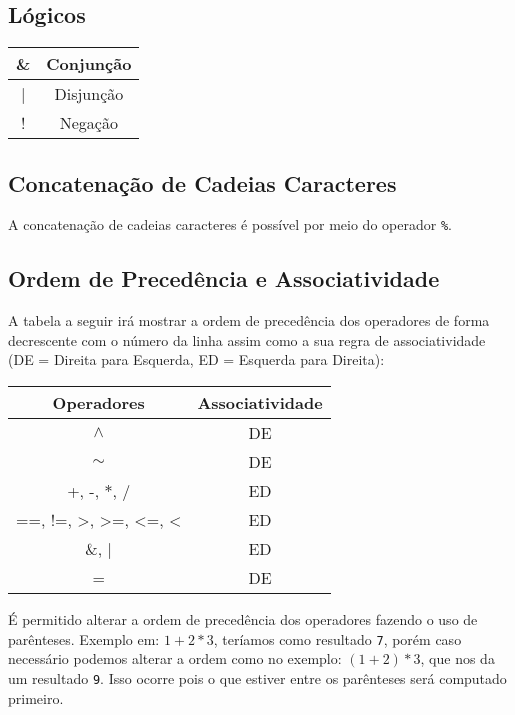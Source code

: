 \documentclass[a4paper,12pt]{article}
\begin{document}
\subsection{Lógicos}
\begin{center}
    \begin{tabular}{|c|c|}
         \hline
         \& & Conjunção\\
         \hline
         | & Disjunção\\
         \hline
         ! & Negação\\
         \hline
    \end{tabular}
\end{center}

\subsection{Concatenação de Cadeias Caracteres}
A concatenação de cadeias caracteres é possível por meio do operador \texttt{\%}.

\subsection{Ordem de Precedência e Associatividade}
A tabela a seguir irá mostrar a ordem de precedência dos operadores de forma decrescente com o
número da linha assim como a sua regra de associatividade (DE = Direita para Esquerda, ED = 
Esquerda para Direita):
\begin{center}
    \begin{tabular}{|c|c|}
         \hline
         \textbf{Operadores} & \textbf{Associatividade}\\
         \hline
         $\wedge$ & DE\\
         \hline
         $\sim$ & DE\\
         \hline
         +, -, $\ast$, / & ED\\
         \hline
         ==, !=, >, >=, <=, < & ED\\
         \hline
         \&, | & ED\\
         \hline
         = & DE\\
         \hline
    \end{tabular}
\end{center}

\hfill

É permitido alterar a ordem de precedência dos operadores fazendo o uso de parênteses.
Exemplo em: $1 + 2 * 3$, teríamos como resultado \texttt{7}, porém caso necessário podemos
alterar a ordem como no exemplo: $(1 + 2) * 3$, que nos da um resultado \texttt{9}. Isso ocorre
pois o que estiver entre os parênteses será computado primeiro.
\end{document}

